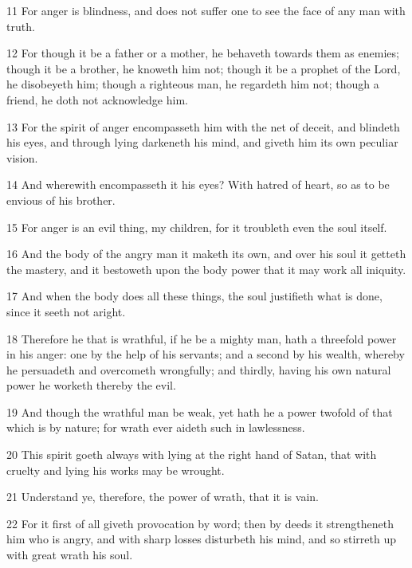 \par 11 For anger is blindness, and does not suffer one to see the face of any man with truth.

\par 12 For though it be a father or a mother, he behaveth towards them as enemies; though it be a brother, he knoweth him not; though it be a prophet of the Lord, he disobeyeth him; though a righteous man, he regardeth him not; though a friend, he doth not acknowledge him.

\par 13 For the spirit of anger encompasseth him with the net of deceit, and blindeth his eyes, and through lying darkeneth his mind, and giveth him its own peculiar vision.

\par 14 And wherewith encompasseth it his eyes? With hatred of heart, so as to be envious of his brother.

\par 15 For anger is an evil thing, my children, for it troubleth even the soul itself.

\par 16 And the body of the angry man it maketh its own, and over his soul it getteth the mastery, and it bestoweth upon the body power that it may work all iniquity.

\par 17 And when the body does all these things, the soul justifieth what is done, since it seeth not aright.

\par 18 Therefore he that is wrathful, if he be a mighty man, hath a threefold power in his anger: one by the help of his servants; and a second by his wealth, whereby he persuadeth and overcometh wrongfully; and thirdly, having his own natural power he worketh thereby the evil.

\par 19 And though the wrathful man be weak, yet hath he a power twofold of that which is by nature; for wrath ever aideth such in lawlessness.

\par 20 This spirit goeth always with lying at the right hand of Satan, that with cruelty and lying his works may be wrought.

\par 21 Understand ye, therefore, the power of wrath, that it is vain.

\par 22 For it first of all giveth provocation by word; then by deeds it strengtheneth him who is angry, and with sharp losses disturbeth his mind, and so stirreth up with great wrath his soul.

